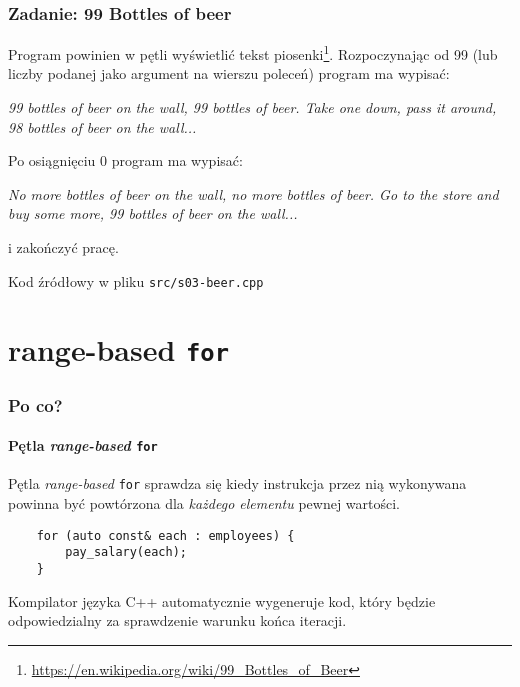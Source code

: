 \documentclass[aspectratio=169]{beamer}
\begin{document}
\begin{frame}[fragile]
    \frametitle{Zadanie: 99 Bottles of beer}
    \label{lecture_exercise_5}

    Program powinien w pętli wyświetlić tekst
    piosenki\footnote{\url{https://en.wikipedia.org/wiki/99_Bottles_of_Beer}}.
    Rozpoczynając od 99 (lub liczby podanej jako argument na wierszu poleceń)
    program ma wypisać:

    \emph{99 bottles of beer on the wall, 99 bottles of beer.\newline
    Take one down, pass it around, 98 bottles of beer on the wall...}

    \vspace{1em}

    Po osiągnięciu 0 program ma wypisać:

    \emph{No more bottles of beer on the wall, no more bottles of beer.\newline
    Go to the store and buy some more, 99 bottles of beer on the wall...}

    i zakończyć pracę.

    \vspace{1em}

    Kod źródłowy w pliku {\tt src/s03-beer.cpp}
\end{frame}

\section{range-based {\tt for}}

\begin{frame}[fragile]
    \frametitle{Po co?}
    \framesubtitle{Pętla \emph{range-based} {\tt for}}

    Pętla \emph{range-based} {\tt for} sprawdza się kiedy instrukcja przez nią
    wykonywana powinna być powtórzona dla \emph{każdego elementu} pewnej
    wartości.

    \begin{lstlisting}
    for (auto const& each : employees) {
        pay_salary(each);
    }
    \end{lstlisting}

    Kompilator języka C++ automatycznie wygeneruje kod, który będzie
    odpowiedzialny za sprawdzenie warunku końca iteracji.
\end{frame}
\end{document}
